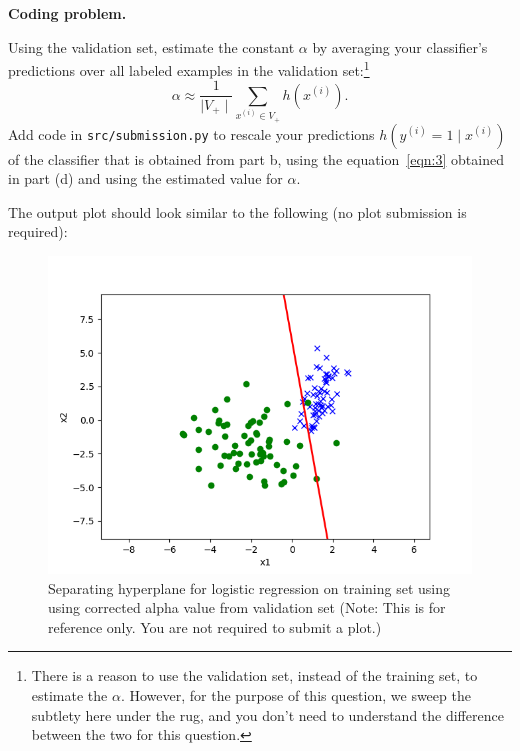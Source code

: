 \item {} \textbf{Coding problem.}

Using the validation set, estimate the constant $\alpha$ by averaging your
classifier's predictions over all labeled examples in the validation set:\footnote{There is a reason to use the validation set, instead of the training set, to estimate the $\alpha$. However, for the purpose of this question, we sweep the subtlety here under the rug, and you don't need to understand the difference between the two for this question. } 
%
\begin{equation*}
  \alpha \approx \frac{1}{\mid V_{+} \mid}\sum_{x^{(i)}\in V_{+}} h(x^{(i)}).
\end{equation*}
%
Add code in \texttt{src/submission.py} to rescale your
 predictions $h(y^{(i)}=1\mid x^{(i)})$ of the classifier that is obtained from part b,  using the equation~\eqref{eqn:3} obtained in part (d) and using the estimated value for $\alpha$.

 The output plot should look similar to the following (no plot submission is required):
 \begin{figure}[H]
   \centering
   \vspace{2mm}
   \includegraphics[width=0.5\linewidth]{02-posonly/posonly_adjusted_pred.png}
     \caption{Separating hyperplane for logistic regression on training set using using corrected alpha value from validation set (Note: This is for reference only.  You are not required to submit a plot.)}
 \end{figure}

